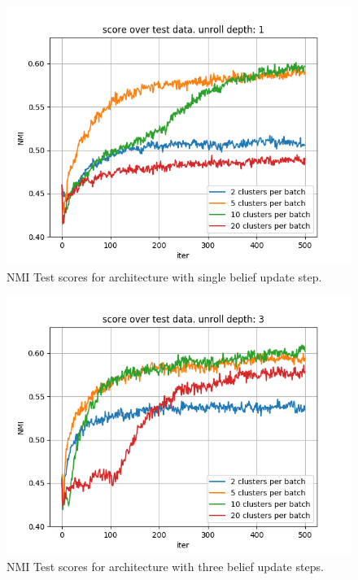 \iffalse
\begin{figure}[h!]
\centering
\includegraphics[width=1\textwidth]{imgs/cub_test_500/square/depth1.png}
\caption{\label{fig:cub_test_500} NMI Test scores for architecture with single belief update step.}
\end{figure}
\begin{figure}[h!]
\centering
\includegraphics[width=1\textwidth]{imgs/cub_test_500/square/depth3.png}
\caption{\label{fig:cub_test_500} NMI Test scores for architecture with three belief update steps.}
\end{figure}
